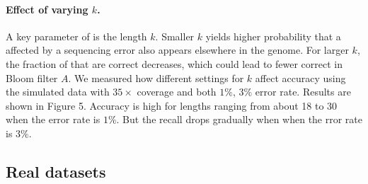 \documentclass{bmcart}
\begin{document}






\paragraph{Effect of varying $k$.}  
A key parameter of \tool is the \kmer length $k$.  Smaller $k$ yields higher probability that a \kmer affected by a sequencing error also appears elsewhere in the genome.  For larger $k$, the fraction of \kmers that are correct decreases, which could lead to fewer correct \kmer in Bloom filter $A$.  We measured how different settings for $k$ affect accuracy using the simulated data with $35\times$ coverage and both $1\%$, $3\%$ error rate.  Results are shown in Figure 5.  Accuracy is high for \kmer lengths ranging from about 18 to 30 when the error rate is $1\%$. But the recall drops gradually when when the rror rate is $3\%$. 






\subsection*{Real datasets}
\end{document}
